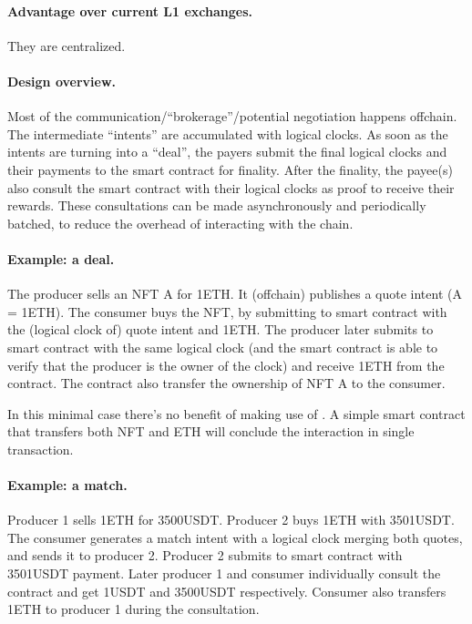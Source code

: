 \paragraph{Advantage over current L1 exchanges.}
They are centralized.

\paragraph{Design overview.}
Most of the communication/``brokerage''/potential negotiation happens offchain.
The intermediate ``intents'' are accumulated with logical clocks.
As soon as the intents are turning into a ``deal'', the payers submit the final logical clocks and their payments to the smart contract for finality.
After the finality, the payee(s) also consult the smart contract with their logical clocks as proof to receive their rewards.
These consultations can be made asynchronously and periodically batched, to reduce the overhead of interacting with the chain.

\paragraph{Example: a deal.}
The producer sells an NFT A for 1ETH.
It (offchain) publishes a quote intent (A = 1ETH).
The consumer buys the NFT, by submitting to \sys smart contract with the (logical clock of) quote intent and 1ETH.
The producer later submits to \sys smart contract with the same logical clock (and the smart contract is able to verify that the producer is the owner of the clock) and receive 1ETH from the contract.
The contract also transfer the ownership of NFT A to the consumer.

In this minimal case there's no benefit of making use of \sys.
A simple smart contract that transfers both NFT and ETH will conclude the interaction in single transaction.

\paragraph{Example: a match.}
Producer 1 sells 1ETH for 3500USDT.
Producer 2 buys 1ETH with 3501USDT.
The consumer generates a match intent with a logical clock merging both quotes, and sends it to producer 2.
Producer 2 submits to \sys smart contract with 3501USDT payment.
Later producer 1 and consumer individually consult the contract and get 1USDT and 3500USDT respectively.
Consumer also transfers 1ETH to producer 1 during the consultation.

